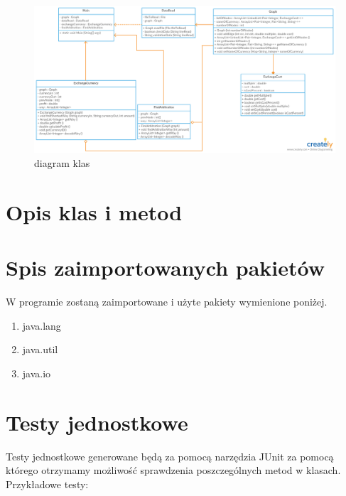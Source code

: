 ﻿\documentclass[12pt]{article}
\begin{document}
\begin{figure}[h!]
\centering
\includegraphics[scale=0.5]{diagram}
\caption{diagram klas}
\label{fig:diagram}
\end{figure}

\section{Opis klas i metod}

\section{Spis zaimportowanych pakietów}
W programie zostaną zaimportowane i użyte pakiety wymienione poniżej. 
\begin{enumerate}
    \item java.lang
    \item java.util
    \item java.io
    
\end{enumerate}

\section{Testy jednostkowe}
Testy jednostkowe generowane będą za pomocą narzędzia JUnit za pomocą którego otrzymamy możliwość sprawdzenia poszczególnych metod w klasach.
Przykładowe testy:
\end{document}
